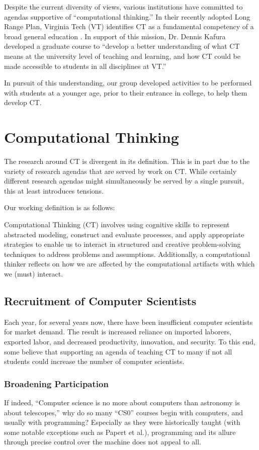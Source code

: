 \documentclass{acm_proc_article-sp}
\begin{document}
Despite the current diversity of views, various institutions have committed to agendas supportive of ``computational thinking.'' In their recently adopted Long Range Plan, Virginia Tech (VT) identifies CT as a fundamental competency of a broad general education \cite{vtlongrange}. In support of this mission, Dr. Dennis Kafura developed a graduate course to ``develop a better understanding of what CT means at the university level of teaching and learning, and how CT could be made accessible to students in all disciplines at VT.''

In pursuit of this understanding, our group developed activities to be performed with students at a younger age, prior to their entrance in college, to help them develop CT.


\section{Computational Thinking}
The research around CT is divergent in its definition. This is in part due to the variety of research agendas that are served by work on CT. While certainly different research agendas might simultaneously be served by a single pursuit, this at least introduces tensions. 

Our working definition is as follows:

Computational Thinking (CT) involves using cognitive skills to represent abstracted modeling, construct and evaluate processes, and apply appropriate strategies to enable us to interact in structured and creative problem-solving techniques to address problems and assumptions. Additionally, a computational thinker reflects on how we are affected by the computational artifacts with which we (must) interact.

\subsection{Recruitment of Computer Scientists}
Each year, for several years now, there have been insufficient computer scientists for market demand. The result is increased reliance on imported laborers, exported labor, and decreased productivity, innovation, and security. To this end, some believe that supporting an agenda of teaching CT to many if not all students could increase the number of computer scientists.

\subsubsection{Broadening Participation}
If indeed, ``Computer science is no more about computers than astronomy is about telescopes,''\cite{cs-astronomy} why do so many ``CS0'' courses begin with computers, and usually with programming? Especially as they were historically taught (with some notable exceptions such as Papert et al.)\cite{logo-readings}, programming and its allure through precise control over the machine does not appeal to all.
\end{document}
